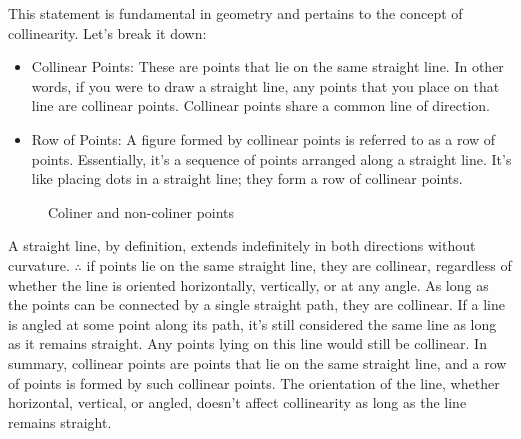 This statement is fundamental in geometry and pertains to the concept of collinearity. Let's break it down:

\begin{itemize}
\item Collinear Points: These are points that lie on the same straight line. In other words, if you were to draw a straight line, any points that you place on that line are collinear points. Collinear points share a common line of direction.
\item Row of Points: A figure formed by collinear points is referred to as a row of points. Essentially, it's a sequence of points arranged along a straight line. It's like placing dots in a straight line; they form a row of collinear points.
\end{itemize}

\begin{figure}[H]
    \centering
    \begin{subfigure}{0.3\textwidth}
    \end{subfigure}
\begin{subfigure}{0.3\textwidth}
    \end{subfigure}
    \caption{Coliner and non-coliner points}
\end{figure}

A straight line, by definition, extends indefinitely in both directions without curvature. $\therefore$ if points lie on the same straight line, they are collinear, regardless of whether the line is oriented horizontally, vertically, or at any angle. As long as the points can be connected by a single straight path, they are collinear.
If a line is angled at some point along its path, it's still considered the same line as long as it remains straight. Any points lying on this line would still be collinear.
In summary, collinear points are points that lie on the same straight line, and a row of points is formed by such collinear points. The orientation of the line, whether horizontal, vertical, or angled, doesn't affect collinearity as long as the line remains straight.

\clearpage